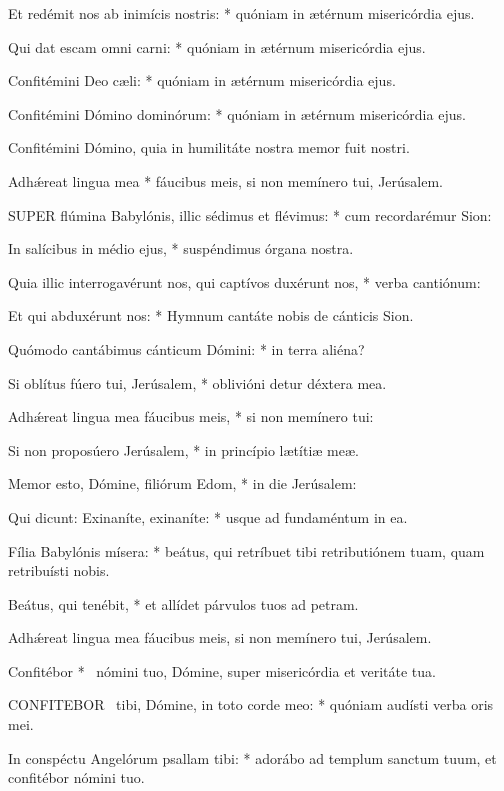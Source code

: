 Et redémit nos ab inimícis nostris: * quóniam in ætérnum misericórdia ejus.

Qui dat escam omni carni: * quóniam in ætérnum misericórdia ejus.

Confitémini Deo cæli: * quóniam in ætérnum misericórdia ejus.

Confitémini Dómino dominórum: * quóniam in ætérnum misericórdia ejus.

 Confitémini Dómino, quia in humilitáte nostra memor fuit nostri.

 Adhǽreat lingua mea * fáucibus meis, si non memínero tui, Jerúsalem.


\lettrine[lines=2]{S}{UPER} flúmina Babylónis, illic sédimus et flévimus: * cum recordarémur Sion:

In salícibus in médio ejus, * suspéndimus órgana nostra.

Quia illic interrogavérunt nos, qui captívos duxérunt nos, * verba cantiónum:

Et qui abduxérunt nos: * Hymnum cantáte nobis de cánticis Sion.

Quómodo cantábimus cánticum Dómini: * in terra aliéna?

Si oblítus fúero tui, Jerúsalem, * oblivióni detur déxtera mea.

Adhǽreat lingua mea fáucibus meis, * si non memínero tui:

Si non proposúero Jerúsalem, * in princípio lætítiæ meæ.

Memor esto, Dómine, filiórum Edom, * in die Jerúsalem:

Qui dicunt: Exinaníte, exinaníte: * usque ad fundaméntum in ea.

Fília Babylónis mísera: * beátus, qui retríbuet tibi retributiónem tuam, quam retribuísti nobis.

Beátus, qui tenébit, * et allídet párvulos tuos ad petram.

 Adhǽreat lingua mea fáucibus meis, si non memínero tui, Jerúsalem.

 Confitébor * \textdagger\ nómini tuo, Dómine, super misericórdia et veritáte tua.


\lettrine[lines=2]{C}{ONFITEBOR} \textdagger\ tibi, Dómine, in toto corde meo: * quóniam audísti verba oris mei.

In conspéctu Angelórum psallam tibi: * adorábo ad templum sanctum tuum, et confitébor nómini tuo.


